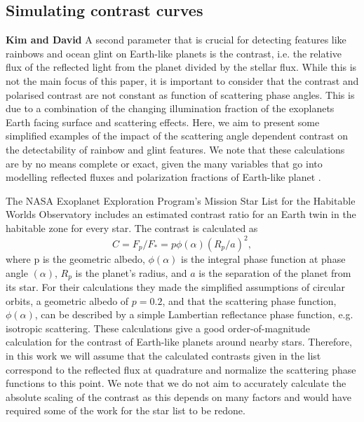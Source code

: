 \documentclass[
    usenatbib,
]{mnras}
\begin{document}


\subsection{Simulating contrast curves}
\textbf{Kim and David}
%
A second parameter that is crucial for detecting features like rainbows and ocean glint on Earth-like planets is the contrast, i.e. the relative flux of the reflected light from the planet divided by the stellar flux. 
%
While this is not the main focus of this paper, it is important to consider that the contrast and polarised contrast are not constant as function of scattering phase angles.
%
This is due to a combination of the changing illumination fraction of the exoplanets Earth facing surface and scattering effects.
%
Here, we aim to present some simplified examples of the impact of the scattering angle dependent contrast on the detectability of rainbow and glint features. 
%
We note that these calculations are by no means complete or exact, given the many variables that go into modelling reflected fluxes and polarization fractions of Earth-like planet \citep{ treesstam2019,trees2022}.


The NASA Exoplanet Exploration Program’s Mission Star List for the Habitable Worlds Observatory includes an estimated contrast ratio for an Earth twin in the habitable zone for every star. 
%
The contrast is calculated as 
\begin{equation}
C = F_p/F_* = p \phi (\alpha) (R_p/a)^2,
\end{equation}
where p is the geometric albedo, $\phi (\alpha)$ is the integral phase function at phase angle $(\alpha)$, $R_p$ is the planet’s radius, and $a$ is the separation of the planet from its star. 
%
For their calculations they made the simplified assumptions of circular orbits, a geometric albedo of $p=0.2$, and that the scattering phase function, $\phi (\alpha)$, can be described by a simple Lambertian reflectance phase function, e.g. isotropic scattering.
%
These calculations give a good order-of-magnitude calculation for the contrast of Earth-like planets around nearby stars.
%
Therefore, in this work we will assume that the calculated contrasts given in the list correspond to the reflected flux at quadrature and normalize the scattering phase functions to this point.
%
We note that we do not aim to accurately calculate the absolute scaling of the contrast as this depends on many factors and would have required some of the work for the star list to be redone.
\end{document}
